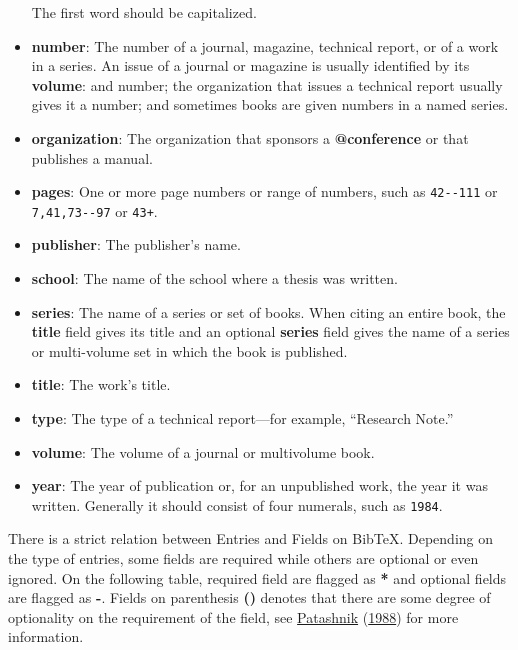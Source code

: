 \documentclass[
]{article}
\begin{document}
\begin{itemize}
  The first word should be capitalized.
\item
  \textbf{number}: The number of a journal, magazine, technical report,
  or of a work in a series. An issue of a journal or magazine is usually
  identified by its \textbf{volume}: and number; the organization that
  issues a technical report usually gives it a number; and sometimes
  books are given numbers in a named series.
\item
  \textbf{organization}: The organization that sponsors a
  \textbf{@conference} or that publishes a manual.
\item
  \textbf{pages}: One or more page numbers or range of numbers, such as
  \texttt{42-\/-111} or \texttt{7,41,73-\/-97} or \texttt{43+}.
\item
  \textbf{publisher}: The publisher's name.
\item
  \textbf{school}: The name of the school where a thesis was written.
\item
  \textbf{series}: The name of a series or set of books. When citing an
  entire book, the \textbf{title} field gives its title and an optional
  \textbf{series} field gives the name of a series or multi-volume set
  in which the book is published.
\item
  \textbf{title}: The work's title.
\item
  \textbf{type}: The type of a technical report---for example,
  ``Research Note.''
\item
  \textbf{volume}: The volume of a journal or multivolume book.
\item
  \textbf{year}: The year of publication or, for an unpublished work,
  the year it was written. Generally it should consist of four numerals,
  such as \texttt{1984}.
\end{itemize}

There is a strict relation between Entries and Fields on BibTeX.
Depending on the type of entries, some fields are required while others
are optional or even ignored. On the following table, required field are
flagged as \textbf{*} and optional fields are flagged as \textbf{-}.
Fields on parenthesis \textbf{()} denotes that there are some degree of
optionality on the requirement of the field, see
\protect\hyperlink{ref-patashnik1988}{Patashnik}
(\protect\hyperlink{ref-patashnik1988}{1988}) for more information.
\end{document}
